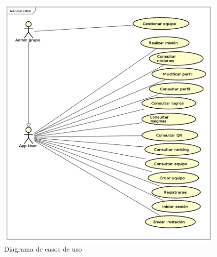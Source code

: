 \documentclass[twoside]{report}
\begin{document}
\begin{figure}[H]
\begin{center}
\includegraphics[scale=0.6]{images/usecase.png}
\caption{Diagrama de casos de uso}
\end{center}
\end{figure}

\end{document}
